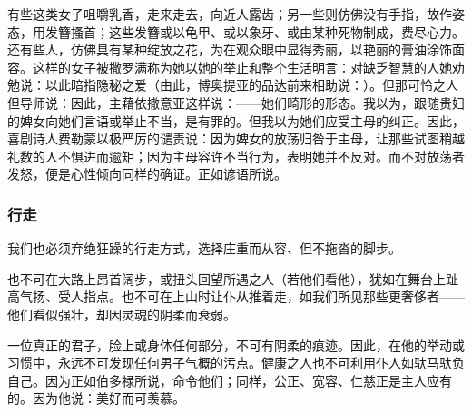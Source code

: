 有些这类女子咀嚼乳香，走来走去，向近人露齿；另一些则仿佛没有手指，故作姿态，用发簪搔首；这些发簪或以龟甲、或以象牙、或由某种死物制成，费尽心力。还有些人，仿佛具有某种绽放之花，为在观众眼中显得秀丽，以艳丽的膏油涂饰面容。这样的女子被撒罗满称为她以她的举止和整个生活明言：对缺乏智慧的人她劝勉说：以此暗指隐秘之爱（由此，博奥提亚的品达前来相助说：）。但那可怜之人但导师说：因此，主藉依撒意亚这样说：——她们畸形的形态。我以为，跟随贵妇的婢女向她们言语或举止不当，是有罪的。但我以为她们应受主母的纠正。因此，喜剧诗人费勒蒙以极严厉的谴责说：因为婢女的放荡归咎于主母，让那些试图稍越礼数的人不惧进而逾矩；因为主母容许不当行为，表明她并不反对。而不对放荡者发怒，便是心性倾向同样的确证。正如谚语所说。\par


\subsubsection{行走}

我们也必须弃绝狂躁的行走方式，选择庄重而从容、但不拖沓的脚步。\par

也不可在大路上昂首阔步，或扭头回望所遇之人（若他们看他），犹如在舞台上趾高气扬、受人指点。也不可在上山时让仆从推着走，如我们所见那些更奢侈者——他们看似强壮，却因灵魂的阴柔而衰弱。\par

一位真正的君子，脸上或身体任何部分，不可有阴柔的痕迹。因此，在他的举动或习惯中，永远不可发现任何男子气概的污点。健康之人也不可利用仆人如驮马驮负自己。因为正如伯多禄所说，命令他们；同样，公正、宽容、仁慈正是主人应有的。因为他说：美好而可羡慕。\par

